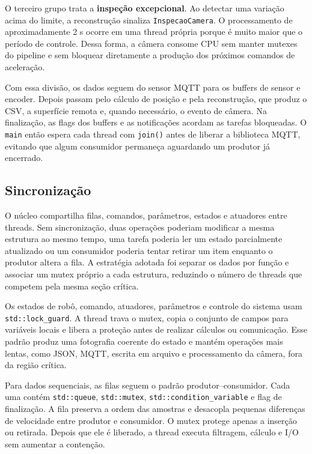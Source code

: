 \documentclass[12pt,a4paper]{article}
\begin{document}
O terceiro grupo trata a \textbf{inspeção excepcional}. Ao detectar uma variação acima do limite, a reconstrução sinaliza \texttt{InspecaoCamera}. O processamento de aproximadamente 2 s ocorre em uma thread própria porque é muito maior que o período de controle. Dessa forma, a câmera consome CPU sem manter mutexes do pipeline e sem bloquear diretamente a produção dos próximos comandos de aceleração.

Com essa divisão, os dados seguem do sensor MQTT para os buffers de sensor e encoder. Depois passam pelo cálculo de posição e pela reconstrução, que produz o CSV, a superfície remota e, quando necessário, o evento de câmera. Na finalização, as flags dos buffers e as notificações acordam as tarefas bloqueadas. O \texttt{main} então espera cada thread com \texttt{join()} antes de liberar a biblioteca MQTT, evitando que algum consumidor permaneça aguardando um produtor já encerrado.

\subsection{Sincronização}

O núcleo compartilha filas, comandos, parâmetros, estados e atuadores entre threads. Sem sincronização, duas operações poderiam modificar a mesma estrutura ao mesmo tempo, uma tarefa poderia ler um estado parcialmente atualizado ou um consumidor poderia tentar retirar um item enquanto o produtor altera a fila. A estratégia adotada foi separar os dados por função e associar um mutex próprio a cada estrutura, reduzindo o número de threads que competem pela mesma seção crítica.

Os estados de robô, comando, atuadores, parâmetros e controle do sistema usam \texttt{std::lock\_guard}. A thread trava o mutex, copia o conjunto de campos para variáveis locais e libera a proteção antes de realizar cálculos ou comunicação. Esse padrão produz uma fotografia coerente do estado e mantém operações mais lentas, como JSON, MQTT, escrita em arquivo e processamento da câmera, fora da região crítica.

Para dados sequenciais, as filas seguem o padrão produtor--consumidor. Cada uma contém \texttt{std::queue}, \texttt{std::mutex}, \texttt{std::condition\_variable} e flag de finalização. A fila preserva a ordem das amostras e desacopla pequenas diferenças de velocidade entre produtor e consumidor. O mutex protege apenas a inserção ou retirada. Depois que ele é liberado, a thread executa filtragem, cálculo e I/O sem aumentar a contenção.
\end{document}
